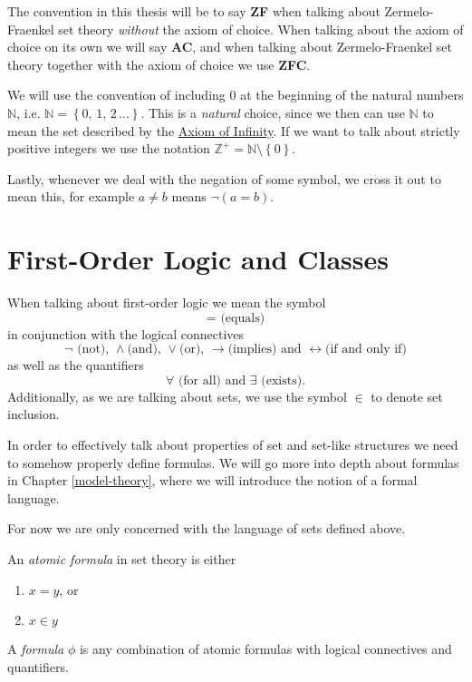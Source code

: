 \documentclass[../../main.tex]{subfiles}
\begin{document}
The convention in this thesis will be to say \textbf{ZF} when talking about Zermelo-Fraenkel set theory \textit{without} the axiom of choice.
When talking about the axiom of choice on its own we will say \textbf{AC}, and when talking about Zermelo-Fraenkel set theory together with the axiom of choice we use \textbf{ZFC}.

We will use the convention of including $0$ at the beginning of the natural numbers $\mathbb{N}$, i.e. $\mathbb{N} = \left\{0, \, 1, \, 2\, \ldots\right\}$.
This is a \textit{natural} choice, since we then can use $\mathbb{N}$ to mean the set described by the \hyperref[ZF7]{Axiom of Infinity}.
If we want to talk about strictly positive integers we use the notation $\mathbb{Z}^+ = \mathbb{N}\setminus\left\{0\right\}$.

Lastly, whenever we deal with the negation of some symbol, we cross it out to mean this, for example $a \neq b$ means $\lnot \left(a = b\right)$.

\section{First-Order Logic and Classes}
When talking about first-order logic we mean the symbol $$= \text{ (equals)}$$ in conjunction with the logical connectives
$$\lnot \text{ (not), } \wedge \text{(and), } \vee \text{(or), } \rightarrow \text{(implies) and } \leftrightarrow \text{(if and only if)}$$
as well as the quantifiers $$\forall \text{ (for all) and } \exists \text{ (exists)}.$$
Additionally, as we are talking about sets, we use the symbol $\in$ to denote set inclusion. \cite[pp.2-3]{Jec78}

In order to effectively talk about properties of set and set-like structures we need to somehow properly define formulas.
We will go more into depth about formulas in Chapter \ref{model-theory}, where we will introduce the notion of a formal language.

For now we are only concerned with the language of sets defined above.

\begin{definition}
    An \textit{atomic formula} in set theory is either
    \begin{enumerate}
        \item $x = y$, or
        \item $x \in y$
    \end{enumerate}
    A \textit{formula} $\phi$ is any combination of atomic formulas with logical connectives and quantifiers.
\end{definition}
\end{document}
